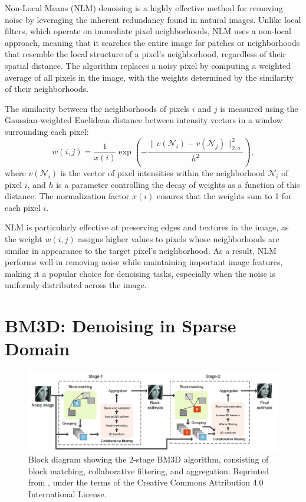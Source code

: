 Non-Local Means (NLM) denoising is a highly effective method for removing noise by leveraging the inherent redundancy found in natural images. Unlike local filters, which operate on immediate pixel neighborhoods, NLM uses a non-local approach, meaning that it searches the entire image for patches or neighborhoods that resemble the local structure of a pixel's neighborhood, regardless of their spatial distance. The algorithm replaces a noisy pixel by computing a weighted average of all pixels in the image, with the weights determined by the similarity of their neighborhoods.

The similarity between the neighborhoods of pixels $i$ and $j$ is measured using the Gaussian-weighted Euclidean distance between intensity vectors in a window surrounding each pixel:
\begin{equation}
    w(i,j) = \frac{1}{x(i)} \exp \left( -\frac{\|v(\mathcal{N}_i) - v(\mathcal{N}_j)\|_{2,a}^2}{h^2} \right),
\end{equation}
where $v(\mathcal{N}_i)$ is the vector of pixel intensities within the neighborhood $\mathcal{N}_i$ of pixel $i$, and $h$ is a parameter controlling the decay of weights as a function of this distance. The normalization factor $x(i)$ ensures that the weights sum to 1 for each pixel $i$.

NLM is particularly effective at preserving edges and textures in the image, as the weight $w(i,j)$ assigns higher values to pixels whose neighborhoods are similar in appearance to the target pixel's neighborhood. As a result, NLM performs well in removing noise while maintaining important image features, making it a popular choice for denoising tasks, especially when the noise is uniformly distributed across the image.


\section{BM3D: Denoising in Sparse Domain}

\begin{figure}
    \centering
    \includegraphics[width=1\linewidth]{images/bm3d_schematic.png}
    \caption{Block diagram showing the 2-stage \gls{BM3D} algorithm, consisting of block matching, collaborative filtering, and aggregation. Reprinted from \cite{wangFPGABasedHardwareAccelerator2020}, under the terms of the Creative Commons Attribution 4.0 International License.}
    \label{fig:bm3d-schematic}
\end{figure}



